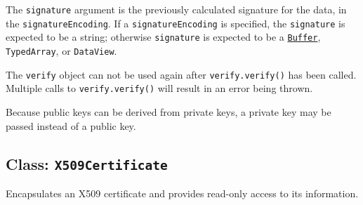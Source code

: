 The \texttt{signature} argument is the previously calculated signature
for the data, in the \texttt{signatureEncoding}. If a
\texttt{signatureEncoding} is specified, the \texttt{signature} is
expected to be a string; otherwise \texttt{signature} is expected to be
a \href{buffer.md}{\texttt{Buffer}}, \texttt{TypedArray}, or
\texttt{DataView}.

The \texttt{verify} object can not be used again after
\texttt{verify.verify()} has been called. Multiple calls to
\texttt{verify.verify()} will result in an error being thrown.

Because public keys can be derived from private keys, a private key may
be passed instead of a public key.

\subsection{\texorpdfstring{Class:
\texttt{X509Certificate}}{Class: X509Certificate}}\label{class-x509certificate}

Encapsulates an X509 certificate and provides read-only access to its
information.

\begin{Shaded}
\begin{Highlighting}[]
\OperatorTok{=}  \NormalTok{(}\NormalTok{)}\OperatorTok{;}

\OperatorTok{=}  \NormalTok{(}\NormalTok{)}\OperatorTok{;}

\NormalTok{)}\OperatorTok{;}
\end{Highlighting}
\end{Shaded}

\begin{Shaded}
\begin{Highlighting}[]
\OperatorTok{=} \NormalTok{(}\NormalTok{)}\OperatorTok{;}

\OperatorTok{=}  \NormalTok{(}\NormalTok{)}\OperatorTok{;}

\NormalTok{)}\OperatorTok{;}
\end{Highlighting}
\end{Shaded}


